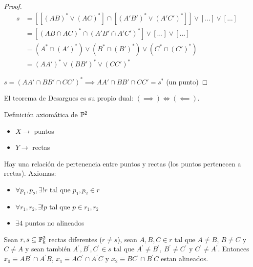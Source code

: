 \begin{proof}
\begin{align*}
    s &= \left[ \left[ \left(AB\right)^* \vee \left(AC\right)^* \right] \cap \left[ \left(A'B'\right)^* \vee \left(A'C'\right)^* \right] \right]
    \vee [\dots ] \vee [\dots] \\
    &= \left[ (AB \cap AC)^* \cap \left(A'B' \cap A'C' \right)^* \right] \vee [\dots] \vee [\dots] \\
    &= \left(A^* \cap (A')^* \right) \vee \left(B^* \cap (B')^* \right) \vee \left(C^* \cap (C')^* \right) \\
    &= (AA')^* \vee (BB')^* \vee (CC')^*
\end{align*}

$s = (AA' \cap BB' \cap CC')^* \implies AA' \cap BB' \cap CC' = s^*$ (un punto)
\end{proof}
\begin{obs}
El teorema de Desargues es su propio dual: $(\implies) \iff (\impliedby)$.
\end{obs}
\begin{obs}
Definición axiomática de $\mathbb{P}^2$
\begin{itemize}
    \item $X \rightarrow$ puntos
    \item $Y \rightarrow$ rectas
\end{itemize}
Hay una relación de pertenencia entre puntos y rectas (los puntos pertenecen a rectas). Axiomas:
\begin{itemize}
    \item $\forall p_1, p_2, \exists! r$ tal que $p_1, p_2 \in r$
    \item $\forall r_1, r_2, \exists! p$ tal que $p \in r_1, r_2$
    \item $\exists 4$ puntos no alineados
\end{itemize}
\end{obs}


\begin{teo}[ de Pappus]
Sean $r,s \subseteq \mathbb{P}^2_\Bbbk$ rectas diferentes ($r \neq s$), sean
$A,B,C \in r$ tal que $A \neq B$, $B \neq C$ y $C\neq A$ y sean también
$A^\prime,B^\prime,C^\prime \in s$ tal que $A^\prime \neq B^\prime$,
$B^\prime \neq C^\prime$ y $C^\prime \neq A^\prime$. Entonces
$x_0 \equiv AB^\prime \cap A^\prime B$, $x_1 \equiv AC^\prime \cap A^\prime C$
y $x_2 \equiv BC^\prime \cap B^\prime C$ estan alineados.
\end{teo}

